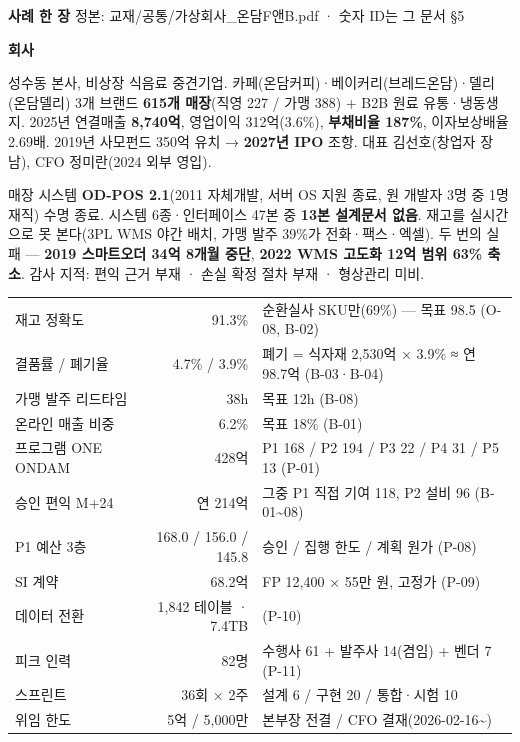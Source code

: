 \documentclass[10pt]{article}
\newcommand{\hd}[1]{{\color{navy}\bfseries\large #1}\par\vspace{1pt}{\color{navy}\rule{\linewidth}{0.6pt}}\par\vspace{3pt}}
\begin{document}
\small
{\color{navy}\bfseries\LARGE 사례 한 장}  \hfill {\color{grey}\footnotesize 정본: 교재/공통/가상회사\_온담F앤B.pdf · 숫자 ID는 그 문서 §5}

\vspace{4pt}
\begin{minipage}[t]{0.47\linewidth}
\hd{회사}
성수동 본사, 비상장 식음료 중견기업. 카페(온담커피)·베이커리(브레드온담)·델리(온담델리) 3개 브랜드 \textbf{615개 매장}(직영 227 / 가맹 388) + B2B 원료 유통·냉동생지. 2025년 연결매출 \textbf{8,740억}, 영업이익 312억(3.6\%), \textbf{부채비율 187\%}, 이자보상배율 2.69배. 2019년 사모펀드 350억 유치 → \textbf{2027년 IPO} 조항. 대표 김선호(창업자 장남), CFO 정미란(2024 외부 영입).

\vspace{4pt}\hd{왜 P1인가}
매장 시스템 \textbf{OD-POS 2.1}(2011 자체개발, 서버 OS 지원 종료, 원 개발자 3명 중 1명 재직) 수명 종료. 시스템 6종·인터페이스 47본 중 \textbf{13본 설계문서 없음}. 재고를 실시간으로 못 본다(3PL WMS 야간 배치, 가맹 발주 39\%가 전화·팩스·엑셀).
두 번의 실패 — \textbf{2019 스마트오더 34억 8개월 중단}, \textbf{2022 WMS 고도화 12억 범위 63\% 축소}. 감사 지적: 편익 근거 부재 · 손실 확정 절차 부재 · 형상관리 미비.

\vspace{4pt}\hd{핵심 숫자 12}
\begin{tabularx}{\linewidth}{@{}l r l @{}}
\toprule
재고 정확도 & 91.3\% & 순환실사 SKU만(69\%) — 목표 98.5 (O-08, B-02)\\
결품률 / 폐기율 & 4.7\% / 3.9\% & 폐기 = 식자재 2,530억 × 3.9\% ≈ 연 98.7억 (B-03·B-04)\\
가맹 발주 리드타임 & 38h & 목표 12h (B-08)\\
온라인 매출 비중 & 6.2\% & 목표 18\% (B-01)\\
프로그램 ONE ONDAM & 428억 & P1 168 / P2 194 / P3 22 / P4 31 / P5 13 (P-01)\\
승인 편익 M+24 & 연 214억 & 그중 P1 직접 기여 118, P2 설비 96 (B-01\textasciitilde08)\\
P1 예산 3층 & 168.0 / 156.0 / 145.8 & 승인 / 집행 한도 / 계획 원가 (P-08)\\
SI 계약 & 68.2억 & FP 12,400 × 55만 원, 고정가 (P-09)\\
데이터 전환 & 1,842 테이블 · 7.4TB & (P-10)\\
피크 인력 & 82명 & 수행사 61 + 발주사 14(겸임) + 벤더 7 (P-11)\\
스프린트 & 36회 × 2주 & 설계 6 / 구현 20 / 통합·시험 10\\
위임 한도 & 5억 / 5,000만 & 본부장 전결 / CFO 결재(2026-02-16\textasciitilde)\\
\bottomrule
\end{tabularx}


\end{minipage}
\end{document}
